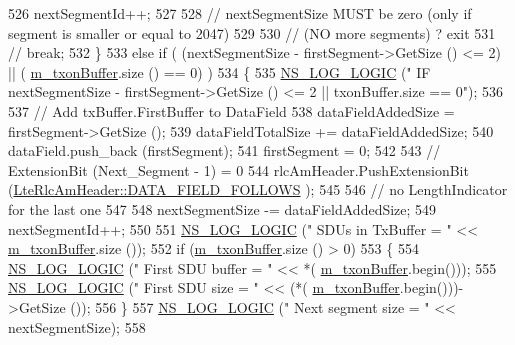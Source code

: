 \begin{DoxyCode}
526           nextSegmentId++;
527 
528           \textcolor{comment}{// nextSegmentSize MUST be zero (only if segment is smaller or equal to 2047)}
529 
530           \textcolor{comment}{// (NO more segments) ? exit}
531           \textcolor{comment}{// break;}
532         \}
533       \textcolor{keywordflow}{else} \textcolor{keywordflow}{if} ( (nextSegmentSize - firstSegment->GetSize () <= 2) || (
      \hyperlink{classns3_1_1LteRlcAm_ad8ba4549a7c78cfe0e528d2e9cc465f8}{m\_txonBuffer}.size () == 0) )
534         \{
535           \hyperlink{group__logging_ga88acd260151caf2db9c0fc84997f45ce}{NS\_LOG\_LOGIC} (\textcolor{stringliteral}{"    IF nextSegmentSize - firstSegment->GetSize () <= 2 ||
       txonBuffer.size == 0"});
536 
537           \textcolor{comment}{// Add txBuffer.FirstBuffer to DataField}
538           dataFieldAddedSize = firstSegment->GetSize ();
539           dataFieldTotalSize += dataFieldAddedSize;
540           dataField.push\_back (firstSegment);
541           firstSegment = 0;
542 
543           \textcolor{comment}{// ExtensionBit (Next\_Segment - 1) = 0}
544           rlcAmHeader.PushExtensionBit (\hyperlink{classns3_1_1LteRlcAmHeader_a516bc34a521085f22b455aeac9ebc364ad70b61eeac2e18a01f13b8f94530ba1f}{LteRlcAmHeader::DATA\_FIELD\_FOLLOWS}
      );
545 
546           \textcolor{comment}{// no LengthIndicator for the last one}
547 
548           nextSegmentSize -= dataFieldAddedSize;
549           nextSegmentId++;
550 
551           \hyperlink{group__logging_ga88acd260151caf2db9c0fc84997f45ce}{NS\_LOG\_LOGIC} (\textcolor{stringliteral}{"        SDUs in TxBuffer  = "} << 
      \hyperlink{classns3_1_1LteRlcAm_ad8ba4549a7c78cfe0e528d2e9cc465f8}{m\_txonBuffer}.size ());
552           \textcolor{keywordflow}{if} (\hyperlink{classns3_1_1LteRlcAm_ad8ba4549a7c78cfe0e528d2e9cc465f8}{m\_txonBuffer}.size () > 0)
553             \{
554               \hyperlink{group__logging_ga88acd260151caf2db9c0fc84997f45ce}{NS\_LOG\_LOGIC} (\textcolor{stringliteral}{"        First SDU buffer  = "} << *(
      \hyperlink{classns3_1_1LteRlcAm_ad8ba4549a7c78cfe0e528d2e9cc465f8}{m\_txonBuffer}.begin()));
555               \hyperlink{group__logging_ga88acd260151caf2db9c0fc84997f45ce}{NS\_LOG\_LOGIC} (\textcolor{stringliteral}{"        First SDU size    = "} << (*(
      \hyperlink{classns3_1_1LteRlcAm_ad8ba4549a7c78cfe0e528d2e9cc465f8}{m\_txonBuffer}.begin()))->GetSize ());
556             \}
557           \hyperlink{group__logging_ga88acd260151caf2db9c0fc84997f45ce}{NS\_LOG\_LOGIC} (\textcolor{stringliteral}{"        Next segment size = "} << nextSegmentSize);
558 

\end{DoxyCode}
